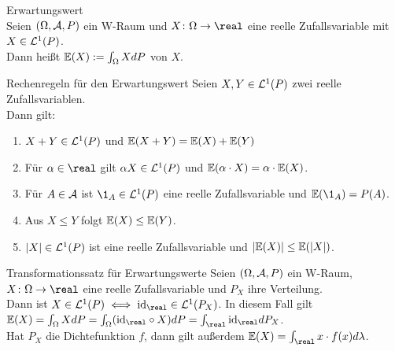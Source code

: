 \begin{Def}{Erwartungswert}\\
    Seien $(\Omega, \mathcal{A}, P)$ ein W-Raum und $X\colon \Omega \rightarrow \real$ eine reelle
    Zufallsvariable mit $X \in \mathcal{L}^1(P)$.\\
    Dann heißt $\mathbb{E}(X) := \int_\Omega X dP$  von $X$.
\end{Def}

\begin{Satz}{Rechenregeln für den Erwartungswert}
    Seien $X, Y \in \mathcal{L}^1(P)$ zwei reelle Zufallsvariablen.\\
    Dann gilt:
    \begin{enumerate}
        \item
        $X + Y \in \mathcal{L}^1(P)$ und $\mathbb{E}(X + Y) = \mathbb{E}(X) + \mathbb{E}(Y)$

        \item
        Für $\alpha \in \real$ gilt $\alpha X \in \mathcal{L}^1(P)$ und
        $\mathbb{E}(\alpha \cdot X) = \alpha \cdot \mathbb{E}(X)$.

        \item
        Für $A \in \mathcal{A}$ ist $\1_A \in \L^1(P)$ eine reelle Zufallsvariable und
        $\EW(\1_A) = P(A)$.

        \item
        Aus $X \le Y$ folgt $\mathbb{E}(X) \le \mathbb{E}(Y)$.

        \item
        $|X| \in \mathcal{L}^1(P)$ ist eine reelle Zufallsvariable und $|\mathbb{E}(X)| \le \mathbb{E}(|X|)$.
    \end{enumerate}
\end{Satz}

\begin{Satz}{Transformationssatz für Erwartungswerte}
    Seien $(\Omega, \mathcal{A}, P)$ ein W-Raum, $X\colon \Omega \rightarrow \real$ eine reelle
    Zufallsvariable und $P_X$ ihre Verteilung.\\
    Dann ist $X \in \L^1(P) \iff \id_\real \in \L^1(P_X)$.
    In diesem Fall gilt
    $\EW(X) = \int_\Omega X dP = \int_\Omega (\id_\real \circ X) dP =
    \int_\real \id_\real dP_X$.\\
    Hat $P_X$ die Dichtefunktion $f$, dann gilt außerdem
    $\EW(X) = \int_\real x \cdot f(x) d\lambda$.
\end{Satz}

